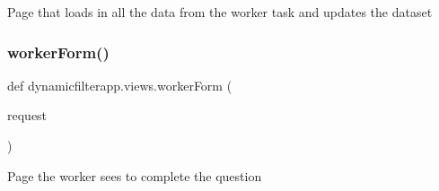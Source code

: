\begin{DoxyVerb}Page that loads in all the data from the worker task and updates the dataset
\end{DoxyVerb}
 \mbox{\label{namespacedynamicfilterapp_1_1views_a41bd6e65140c4010e5aa8332ac5737ca}} 
\subsubsection{\texorpdfstring{worker\+Form()}{workerForm()}}
{\footnotesize\ttfamily def dynamicfilterapp.\+views.\+worker\+Form (\begin{DoxyParamCaption}\item[{}]{request }\end{DoxyParamCaption})}

\begin{DoxyVerb}Page the worker sees to complete the question
\end{DoxyVerb}
 
